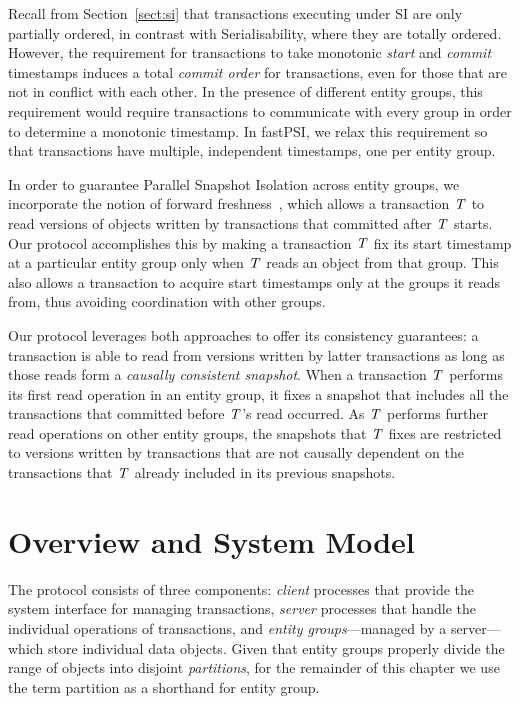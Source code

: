 Recall from Section~\ref{sect:si} that transactions executing under SI are only partially ordered, in contrast with Serialisability, where they are totally ordered. However, the requirement for transactions to take monotonic \emph{start} and \emph{commit} timestamps induces a total \emph{commit order} for transactions, even for those that are not in conflict with each other. In the presence of different entity groups, this requirement would require transactions to communicate with every group in order to determine a monotonic timestamp. In fastPSI, we relax this requirement so that transactions have multiple, independent timestamps, one per entity group.

In order to guarantee Parallel Snapshot Isolation across entity groups, we incorporate the notion of forward freshness~\citep{ardekani_nmsi}, which allows a transaction $\mathit{T}$ to read versions of objects written by transactions that committed after $\mathit{T}$ starts. Our protocol accomplishes this by making a transaction $\mathit{T}$ fix its start timestamp at a particular entity group only when $\mathit{T}$ reads an object from that group. This also allows a transaction to acquire start timestamps only at the groups it reads from, thus avoiding coordination with other groups.

Our protocol leverages both approaches to offer its consistency guarantees: a transaction is able to read from versions written by latter transactions as long as those reads form a \emph{causally consistent snapshot}. When a transaction $\mathit{T}$ performs its first read operation in an entity group, it fixes a snapshot that includes all the transactions that committed before $\mathit{T}$'s read occurred. As $\mathit{T}$ performs further read operations on other entity groups, the snapshots that $\mathit{T}$ fixes are restricted to versions written by transactions that are not causally dependent on the transactions that $\mathit{T}$ already included in its previous snapshots.

\section{Overview and System Model}
\label{sect:protocol_overview}

The protocol consists of three components: \emph{client} processes that provide the system interface for managing transactions, \emph{server} processes that handle the individual operations of transactions, and \emph{entity groups}---managed by a server---which store individual data objects. Given that entity groups properly divide the range of objects into disjoint \emph{partitions}, for the remainder of this chapter we use the term partition as a shorthand for entity group.


